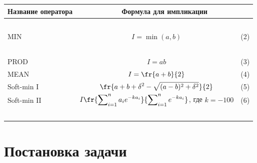   \begin{table}[b]\small %


  \vspace*{-12pt}


  \begin{center}




  \vspace*{2ex}


  


  \begin{tabular}{|l|cc|}


  \hline


\multicolumn{1}{|c|}{Название оператора}&\multicolumn{2}{c|}{Формула для импликации}\\


\hline


&\multicolumn{2}{c}{\ }\\[-9pt]


MIN&$I = \min (a, b)$&(2)\\


&\multicolumn{2}{c|}{\ }\\[-9pt]


PROD&$I=a b$&(3)\\


MEAN&$\displaystyle


I=\fr{a+b}{2}$&(4)\\


Soft-min I&$\displaystyle


\fr{a+b+\delta^2-\sqrt{(a-b)^2+\delta^2}}{2}$&(5)\\


Soft-min II&$\displaystyle


I\fr{\sum\nolimits_{i=1}^n a_i e^{-ka_i}} {\sum\nolimits^n_{i=1} e^{-ka_i}}$, где $k=-


100$&(6)\\[-6pt]


&\multicolumn{2}{c|}{\ }\\


\hline


\end{tabular}


\end{center}


\end{table}





\section{Постановка задачи}





